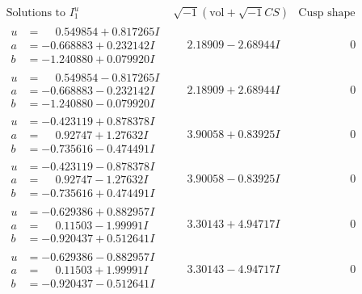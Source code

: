 \documentclass[1p]{elsarticle_modified}
\theoremstyle{definition}
\newcommand{\I}{\sqrt{-1}}
\begin{document}
$$\begin{array}{c|c|c}  
\text{Solutions to }I^u_{1}& \I (\text{vol} + \sqrt{-1}CS) & \text{Cusp shape}\\
 \hline 
\begin{aligned}
u &= \phantom{-}0.549854 + 0.817265 I \\
a &= -0.668883 + 0.232142 I \\
b &= -1.240880 + 0.079920 I\end{aligned}
 & \phantom{-}2.18909 - 2.68944 I & \phantom{-0.000000 } 0 \\ \hline\begin{aligned}
u &= \phantom{-}0.549854 - 0.817265 I \\
a &= -0.668883 - 0.232142 I \\
b &= -1.240880 - 0.079920 I\end{aligned}
 & \phantom{-}2.18909 + 2.68944 I & \phantom{-0.000000 } 0 \\ \hline\begin{aligned}
u &= -0.423119 + 0.878378 I \\
a &= \phantom{-}0.92747 + 1.27632 I \\
b &= -0.735616 - 0.474491 I\end{aligned}
 & \phantom{-}3.90058 + 0.83925 I & \phantom{-0.000000 } 0 \\ \hline\begin{aligned}
u &= -0.423119 - 0.878378 I \\
a &= \phantom{-}0.92747 - 1.27632 I \\
b &= -0.735616 + 0.474491 I\end{aligned}
 & \phantom{-}3.90058 - 0.83925 I & \phantom{-0.000000 } 0 \\ \hline\begin{aligned}
u &= -0.629386 + 0.882957 I \\
a &= \phantom{-}0.11503 - 1.99991 I \\
b &= -0.920437 + 0.512641 I\end{aligned}
 & \phantom{-}3.30143 + 4.94717 I & \phantom{-0.000000 } 0 \\ \hline\begin{aligned}
u &= -0.629386 - 0.882957 I \\
a &= \phantom{-}0.11503 + 1.99991 I \\
b &= -0.920437 - 0.512641 I\end{aligned}
 & \phantom{-}3.30143 - 4.94717 I & \phantom{-0.000000 } 0 \\ \hline\begin{aligned}

\end{aligned}
\end{array}$$
\end{document}
